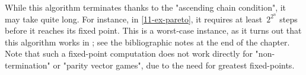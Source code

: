 While this algorithm terminates thanks to the "ascending chain
condition", it may take quite long.  For instance, in
\cref{11-ex-pareto}, it requires at least~$2^{2^n}$ steps before it
reaches its fixed point.  This is a worst-case instance, as it turns
out that this algorithm works in \kEXP[2]; see the bibliographic notes
at the end of the chapter.  Note that such a
fixed-point computation does not work directly for "non-termination"
or "parity vector games", due to the need for greatest fixed-points.

